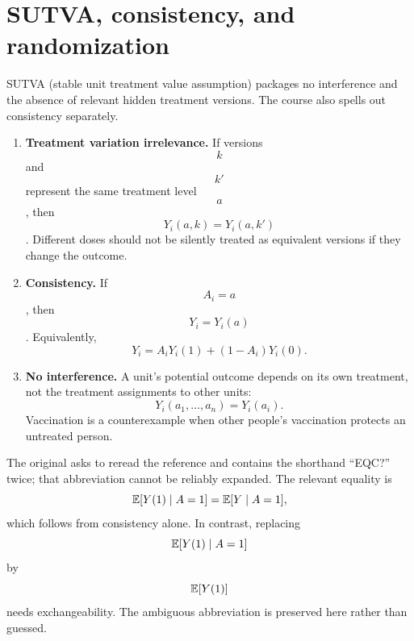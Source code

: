 \section{SUTVA, consistency, and randomization}
SUTVA (stable unit treatment value assumption) packages no interference and the absence of relevant hidden treatment versions. The course also spells out consistency separately.
\begin{enumerate}
\item \textbf{Treatment variation irrelevance.} If versions $$k$$ and $$k'$$ represent the same treatment level $$a$$, then $$Y_i(a,k)=Y_i(a,k')$$. Different doses should not be silently treated as equivalent versions if they change the outcome.
\item \textbf{Consistency.} If $$A_i=a$$, then $$Y_i=Y_i(a)$$. Equivalently,
\begin{equation}
Y_i=A_iY_i(1)+(1-A_i)Y_i(0).
\end{equation}
\item \textbf{No interference.} A unit's potential outcome depends on its own treatment, not the treatment assignments to other units:
\begin{equation}
Y_i(a_1,\ldots,a_n)=Y_i(a_i).
\end{equation}
Vaccination is a counterexample when other people's vaccination protects an untreated person.
\end{enumerate}
\begin{todo}
The original asks to reread the reference and contains the shorthand ``EQC?'' twice; that abbreviation cannot be reliably expanded. The relevant equality is
\begin{equation}
\mathbb E[Y(1)\mid A=1]=\mathbb E[Y\mid A=1],
\end{equation}
which follows from consistency alone. In contrast, replacing $$\mathbb E[Y(1)\mid A=1]$$ by $$\mathbb E[Y(1)]$$ needs exchangeability. The ambiguous abbreviation is preserved here rather than guessed.
\end{todo}

